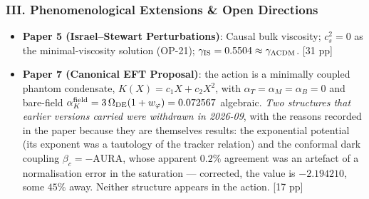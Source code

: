 \documentclass[11pt,a4paper]{article}
\begin{document}
\subsubsection*{III. Phenomenological Extensions \& Open Directions}
\begin{itemize}
  \item \textbf{Paper 5 (Israel--Stewart Perturbations)}: Causal bulk viscosity; $c_s^2=0$ as the minimal-viscosity solution (OP-21); $\gamma_{\rm IS}=0.5504\approx\gamma_{\Lambda\rm CDM}$. [31 pp]
  \item \textbf{Paper 7 (Canonical EFT Proposal)}: the action is a minimally
  coupled phantom condensate, $K(X)=c_1X+c_2X^2$, with
  $\alpha_T=\alpha_M=\alpha_B=0$ and bare-field
  $\alpha_K^{\rm field}=3\,\Omega_{\rm DE}(1+w_\varphi)=0.072567$ algebraic.
  \emph{Two structures that earlier versions carried were withdrawn in
  2026-09}, with the reasons recorded in the paper because they are themselves
  results: the exponential potential (its exponent was a
  tautology of the tracker relation) and the conformal dark coupling
  $\beta_c=-\text{AURA}$, whose apparent $0.2\%$ agreement was an artefact of a
  normalisation error in the saturation --- corrected, the value is $-2.194210$,
  some $45\%$ away. Neither structure appears in the action. [17 pp]
\end{itemize}
\end{document}
